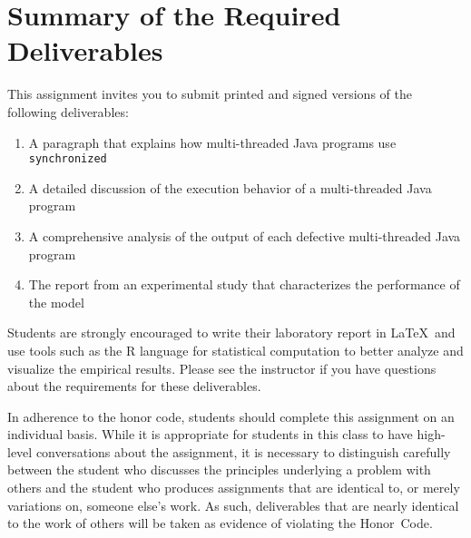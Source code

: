 \section*{Summary of the Required Deliverables}

This assignment invites you to submit printed and signed versions of the following deliverables: 

  \begin{enumerate}
    \item A paragraph that explains how multi-threaded Java programs use {\tt synchronized} 
    \item A detailed discussion of the execution behavior of a multi-threaded Java program
    \item A comprehensive analysis of the output of each defective multi-threaded Java program
    \item The report from an experimental study that characterizes the performance of the model 
  \end{enumerate}

Students are strongly encouraged to write their laboratory report in \LaTeX~and use tools such as the R language for statistical
computation to better analyze and visualize the empirical results. Please see the instructor if you have questions about the
requirements for these deliverables.

In adherence to the honor code, students should complete this assignment on an individual basis. While it is appropriate for
students in this class to have high-level conversations about the assignment, it is necessary to distinguish carefully between the
student who discusses the principles underlying a problem with others and the student who produces assignments that are identical
to, or merely variations on, someone else's work.  As such, deliverables that are nearly identical to the work of others will be
taken as evidence of violating the \mbox{Honor Code}.  



  
